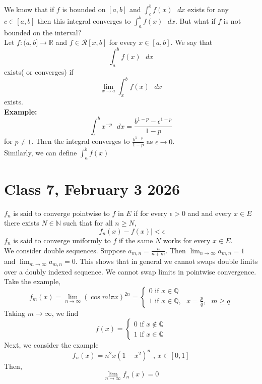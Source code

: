 \documentclass{article}
\begin{document}
We know that if $f$ is bounded on $[a,b]$ and $\int_c^b f(x)\text{ }dx$ exists for any $c\in[a,b]$ then this integral converges to $\int_a^b f(x)\text{ }dx$. But what if $f$ is not bounded on the interval?
\\
Let $f:(a,b]\to\mathbb{R}$ and $f\in\mathcal{R}[x,b]$ for every $x\in[a,b]$. We say that 
$$\int_a^b f(x)\text{ }dx$$
exists( or converges) if 
$$\lim_{x\to a}\int_x^b f(x)\text{ }dx$$ 
exists.\\
\textbf{Example:} $$\int_\epsilon^b x^{-p}\text{ }dx=\frac{b^{1-p}-\epsilon^{1-p}}{1-p}$$ for $p\neq 1$.
Then the integral converges to $\frac{b^{1-p}}{1-p}$ as $\epsilon\to 0$. \\
Similarly, we can define $\int_a^b f(x)$
\section*{Class 7, February 3 2026}
$f_n$ is said to converge pointwise to $f$ in $E$ if for every $\epsilon>0$ and and every $x\in E$ there exists $N\in \mathbb{N}$ such that for all $n\geq N$, 
$$|f_n(x)-f(x)|<\epsilon$$
$f_n$ is said to converge uniformly to $f$ if the same $N$ works for every $x\in E$.\\
We consider double sequences. Suppose $a_{m,n}=\frac{n}{n+m}$. Then $\lim_{n\to \infty}a_{m,n}=1$ and $\lim_{m\to\infty}a_{m,n}=0$. This shows that in general we cannot swaps double limits over a doubly indexed sequence. We cannot swap limits in pointwise convergence. \\
Take the example, $$f_m(x)=\lim_{n\to\infty}(\cos{m!\pi x})^{2n}=
\begin{cases}
0 \text{ if }x\in \mathbb{Q}\\
1 \text{ if }x\in \mathbb{Q}, \text{ }x=\frac{p}{q},\text{ }m\geq q
\end{cases}
$$
Taking $m\to\infty$, we find
$$f(x)=
\begin{cases}
0 \text{ if }x\notin \mathbb{Q}\\
1 \text{ if }x\in \mathbb{Q}
\end{cases}
$$
Next, we consider the example 
$$f_n (x)=n^2 x(1-x^2)^n\text{ , }x\in [0,1]$$
Then, 
$$\lim_{n\to\infty}f_n (x)=0$$
\end{document}
